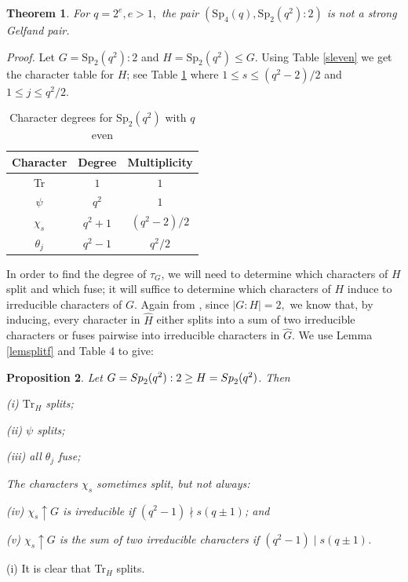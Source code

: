 \documentclass[10pt,a4paper]{amsart}
\newtheorem{thm}{Theorem}[section]
\newtheorem{prop}[thm]{Proposition}
\theoremstyle{plain}
\theoremstyle{definition}
\numberwithin{equation}{section}
\begin{document}
\begin{thm}
For $q=2^e, e>1,$ the pair $\left(\mathrm{Sp}_4(q), \mathrm{Sp}_2\left(q^2\right)\colon 2\right)$ is not a strong Gelfand pair.
\end{thm}

\noindent\textit{Proof.} Let $G=\mathrm{Sp}_2\left(q^2\right)\colon 2$ and $H = \mathrm{Sp}_2\left(q^2\right)\leq G$. Using  Table \ref{sleven} we get the character table for $H$; see  Table \ref{lineardegrees} where  $1 \leq s \leq (q^2-2)/2$ and $1 \leq j \leq q^2/2$.

\begin{table}[h!]
\centering
\caption{Character degrees for $\mathrm{Sp}_{2}\left(q^2\right)$ with $q$ even}
\vspace{5pt}
\label{lineardegrees}
\begin{tabular}{c|c c}
Character & Degree&Multiplicity\\
\hline
 Tr & $1$& $1$\\
$\psi$ & $q^2$& $1$\\
$\chi_s$ & $q^2+1$ & $(q^2-2)/2$\\
$\theta_j$ & $q^2-1$&$q^2/2$
\end{tabular}
\end{table}

In order to find the degree of $\tau_{G}$, we will need to determine which characters of $H$ split and which  fuse; 
it will suffice to determine which characters of $H$ induce to  irreducible characters of $G$. Again from \cite{JaL}, since $|G \colon H|=2,$ we know that, by  inducing, every character in $\hat{H}$ either splits into a sum of two irreducible characters or fuses pairwise into irreducible characters in $\hat{G}$.
We  use Lemma \ref {lemsplitf} and Table 4 to give:

 
\begin{prop}\label{propsplit} Let $G={\rm Sp}_2(q^2):2\ge H={\rm Sp}_2(q^2)$. Then 

\noindent (i) $\text{Tr}_H$ splits;

\noindent (ii)  $\psi$ splits;

\noindent (iii) all $\theta_j$ fuse;

 The characters $\chi_s$ sometimes split, but not always: 
 
\noindent (iv)  $\chi_s\uparrow G$ is  irreducible  if $(q^2-1)\nmid s(q\pm1)$; and 
 
 
 \noindent (v) $\chi_s\uparrow G$ is the sum of two irreducible characters if $(q^2-1) \mid s(q\pm1)$.
\end{prop}
 (i) It is clear that Tr$_H$ splits.
\end{document}
